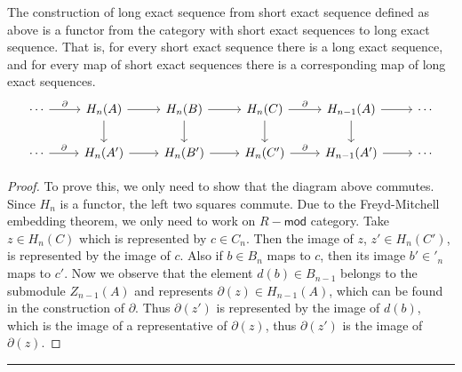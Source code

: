 \begin{prop} The construction of long exact sequence from short exact sequence defined as above is a functor from the category with short exact sequences to long exact sequence. That is, for every short exact sequence there is a long exact sequence, and for every map of short exact sequences there is a corresponding map of long exact sequences.
\begin{equation}
\begin{tikzcd}
\cdots\arrow{r}{\partial} & H_n(A)\arrow{r}\arrow{d} &H_n(B)\arrow{r}\arrow{d} & H_n(C)\arrow{r}{\partial}\arrow{d}&H_{n-1}(A)\arrow{r}\arrow{d}&\cdots\\
\cdots\arrow{r}{\partial} & H_n(A')\arrow{r} &H_n(B')\arrow{r} & H_n(C')\arrow{r}{\partial}&H_{n-1}(A')\arrow{r}&\cdots
\end{tikzcd}
\end{equation}
\end{prop}
\begin{proof}
To prove this, we only need to show that the diagram above commutes. Since $H_n$ is a functor, the left two squares commute. Due to the Freyd-Mitchell embedding theorem, we only need to work on $R-\textsf{mod}$ category. Take $z\in H_n(C)$ which is represented by $c\in C_n$. Then the image of $z$, $z'\in H_n(C')$, is represented by the image of $c$. Also if $b\in B_n$ maps to $c$, then its image $b'\in '_n$ maps to $c'$. Now we observe that the element $d(b)\in B_{n-1}$ belongs to the submodule $Z_{n-1}(A)$ and represents $\partial(z)\in H_{n-1}(A)$, which can be found in the construction of $\partial$. Thus $\partial(z')$ is represented by the image of $d(b)$, which is the image of a representative of $\partial(z)$, thus $\partial(z')$ is the image of $\partial(z)$.
\end{proof}

\noindent\rule{\textwidth}{1pt}
\newline
